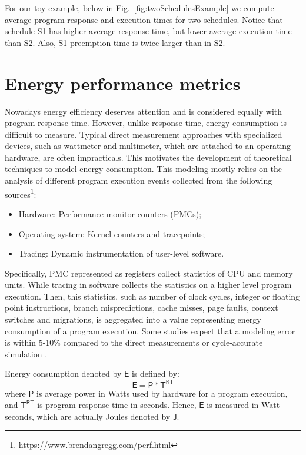 For our toy example, below in Fig.~\ref{fig:twoSchedulesExample} we compute average program response and execution times for two schedules. Notice that schedule S1 has higher average response time, but lower average execution time than S2. Also, S1 preemption time is twice larger than in S2. %

\section{Energy performance metrics}
\label{sec:energyConsumption}

Nowadays energy efficiency deserves attention and is considered equally with program response time. However, unlike response time, energy consumption is difficult to measure. Typical direct measurement approaches with specialized devices, such as wattmeter and multimeter, which are attached to an operating hardware, are often impracticals. This motivates the development of theoretical techniques to model energy consumption. This modeling mostly relies on the analysis of different program execution events collected from the following sources\footnote{https://www.brendangregg.com/perf.html}:
\begin{itemize}
\item Hardware: Performance monitor counters (PMCs);
\item Operating system: Kernel counters and tracepoints;
\item Tracing: Dynamic instrumentation of user-level software.
\end{itemize}
Specifically, PMC represented as registers collect statistics of CPU and memory units. While tracing in software collects the statistics on a higher level program execution. Then, this statistics, such as number of clock cycles, integer or floating point instructions, branch mispredictions, cache misses, page faults, context switches and migrations, is aggregated into a value representing energy consumption of a program execution. Some studies expect that a modeling error is within 5-10\% compared to the direct measurements\cite{Joseph2001, Brooks2000} or cycle-accurate simulation \cite{Li2003}.

Energy consumption denoted by $\mathsf{E}$ is defined by:
%
\begin{equation}
\mathsf{E} = \mathsf{P} * \mathsf{T}^\mathsf{RT}
\end{equation}
%
where $\mathsf{P}$ is average power in Watts used by hardware for a program execution, and $\mathsf{T}^\mathsf{RT}$ is program response time in seconds. Hence, $\mathsf{E}$ is measured in Watt-seconds, which are actually Joules denoted by $\mathsf{J}$.

